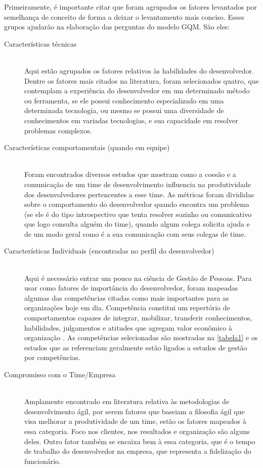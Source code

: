 Primeiramente, é importante citar que foram agrupados os fatores levantados por semelhança de conceito de forma a deixar o levantamento mais conciso. Esses grupos ajudarão na elaboração das perguntas do modelo GQM. São eles:


\begin{description}
	\item[Características técnicas] \hfill \\
	Aqui estão agrupados os fatores relativos às habilidades do desenvolvedor. Dentre os fatores mais citados na literatura, foram selecionados quatro, que contemplam a experiência do desenvolvedor em um determinado método ou ferramenta, se ele possui conhecimento especializado em uma determinada tecnologia, ou mesmo se possui uma diversidade de conhecimentos em variadas tecnologias, e sua capacidade em resolver problemas complexos.
	
	\item[Características comportamentais (quando em equipe)] \hfill \\
	Foram encontrados diversos estudos que mostram como a coesão e a comunicação de um time de desenvolvimento influencia na produtividade dos desenvolvedores pertencentes a esse time. As métricas foram divididas sobre o comportamento do desenvolvedor quando encontra um problema (se ele é do tipo introspectivo que tenta resolver sozinho ou comunicativo que logo consulta alguém do time), quando algum colega solicita ajuda e de um modo geral como é a sua comunicação com seus colegas de time.
	
	\item[Características Individuais (encontradas no perfil do desenvolvedor)] \hfill \\
	Aqui é necessário entrar um pouco na ciência de Gestão de Pessoas. Para usar como fatores de importância do desenvolvedor, foram mapeadas algumas das competências citadas como mais importantes para as organizações hoje em dia. Competência constitui um repertório de comportamentos capazes de integrar, mobilizar, transferir conhecimentos, habilidades, julgamentos e atitudes que agregam valor econômico à organização \cite{Boyatzis1982, Boyatzis2008, Shirazi2009}. As competências selecionadas são mostradas na \autoref{tabela1} e os estudos que as referenciam geralmente estão ligados a estudos de gestão por competências.
	
	\item[Compromisso com o Time/Empresa] \hfill \\
	Amplamente encontrado em literatura relativa às metodologias de desenvolvimento ágil, por serem fatores que baseiam a filosofia ágil que visa melhorar a produtividade de um time, estão os fatores mapeados à essa categoria. Foco nos clientes, nos resultados e organização são alguns deles. Outro fator também se encaixa bem à essa categoria, que é o tempo de trabalho do desenvolvedor na empresa, que representa a fidelização do funcionário.
	
\end{description}

